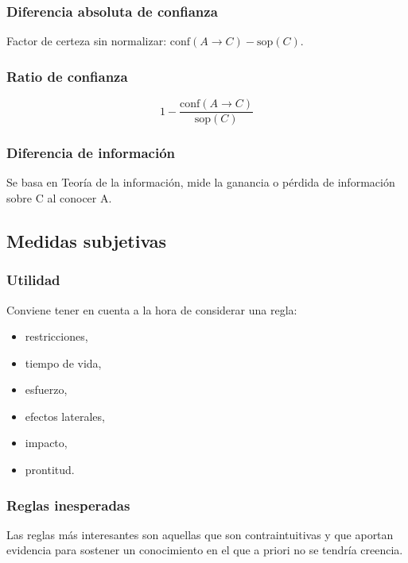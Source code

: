 \documentclass[a4paper,11pt,spanish]{report}
\let\stdsub\subsection
\let\stdsubsub\subsubsection
\renewcommand{\section}{\stdsub}
\renewcommand{\subsection}{\stdsubsub}
\begin{document}
\subsection*{Diferencia absoluta de confianza}
\label{sec-4-2-1-7}

Factor de certeza sin normalizar: $\mathrm{conf}(A\rightarrow C)- \mathrm{sop}(C)$.

\subsection*{Ratio de confianza}
\label{sec-4-2-1-8}

$$1-\frac{\mathrm{conf}(A\rightarrow C)}{ \mathrm{sop}(C)}$$

\subsection*{Diferencia de información}
\label{sec-4-2-1-9}

Se basa en Teoría de la información, mide la ganancia o pérdida de información sobre C al conocer A.

\section{Medidas subjetivas}
\label{sec-4-2-2}

\subsection*{Utilidad}
\label{sec-4-2-2-1}

Conviene tener en cuenta a la hora de considerar una regla:
\begin{itemize}
\item restricciones,
\item tiempo de vida,
\item esfuerzo,
\item efectos laterales,
\item impacto,
\item prontitud.
\end{itemize}

\subsection*{Reglas inesperadas}
\label{sec-4-2-2-2}

Las reglas más interesantes son aquellas que son contraintuitivas y que aportan evidencia para sostener un conocimiento en el que a priori no se tendría creencia.
\end{document}

